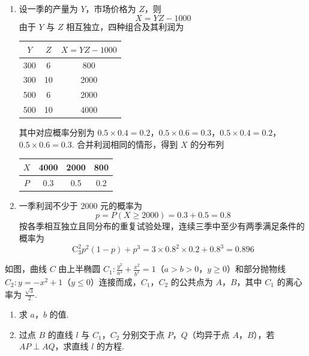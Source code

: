 \begin{solution}
\begin{enumerate}
\item 设一季的产量为 \(Y\)，市场价格为 \(Z\)，则
\[
X=YZ-1000
\]
由于 \(Y\) 与 \(Z\) 相互独立，四种组合及其利润为
\begin{center}
\begin{tabular}{c|c|c}
\(Y\)&\(Z\)&\(X=YZ-1000\)\\ \hline
300&6&800\\
300&10&2000\\
500&6&2000\\
500&10&4000
\end{tabular}
\end{center}
其中对应概率分别为
\(0.5\times0.4=0.2\)，\(0.5\times0.6=0.3\)，\(0.5\times0.4=0.2\)，\(0.5\times0.6=0.3\).
合并利润相同的情形，得到 \(X\) 的分布列
\begin{center}
\begin{tabular}{c|ccc}
\(X\) & 4000 & 2000 & 800 \\
\hline
\(P\) & 0.3 & 0.5 & 0.2
\end{tabular}
\end{center}

\item 一季利润不少于 2000 元的概率为
\[
p=P(X\geqslant2000)=0.3+0.5=0.8
\]
按各季相互独立且同分布的重复试验处理，连续三季中至少有两季满足条件的概率为
\[
\mathrm C_3^2p^2(1-p)+p^3
=3\times0.8^2\times0.2+0.8^3
=0.896
\]
\end{enumerate}
\end{solution}

\begin{problem}
如图，曲线 \(C\) 由上半椭圆 \(C_{1}:\frac{y^{2}}{a^{2}} + \frac{x^{2}}{b^{2}} = 1\)（\(a > b > 0\)，\(y\geqslant 0\)）和部分抛物线 \(C_{2}: y = -x^2 + 1\)（\(y\leqslant 0\)）连接而成，\(C_{1}\)，\(C_{2}\) 的公共点为 \(A\)，\(B\)，其中 \(C_{1}\) 的离心率为 \(\frac{\sqrt{3}}{2}\).

\begin{enumerate}
\item 求 \(a\)，\(b\) 的值.
\item 过点 \(B\) 的直线 \(l\) 与 \(C_{1}\)，\(C_{2}\) 分别交于点 \(P\)，\(Q\)（均异于点 \(A\)，\(B\)），若 \(AP \perp AQ\)，求直线 \(l\) 的方程.
\end{enumerate}

\end{problem}

